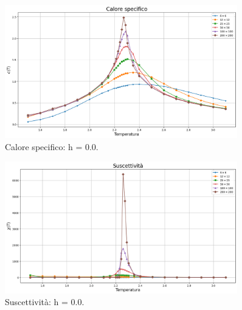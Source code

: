 \begin{figure}[H]
    \centering
    \includegraphics[width=0.9\textwidth]{Immagini/simIsing2D/cp.png}
    \caption{Calore specifico: h = 0.0.}
    \label{fig: cp_Ising2D}
\end{figure}

\begin{figure}[H]
    \centering
    \includegraphics[width=0.9\textwidth]{Immagini/simIsing2D/chi.png}
    \caption{Suscettività: h = 0.0.}
    \label{fig: chi_Ising2D}
\end{figure}

\newpage
